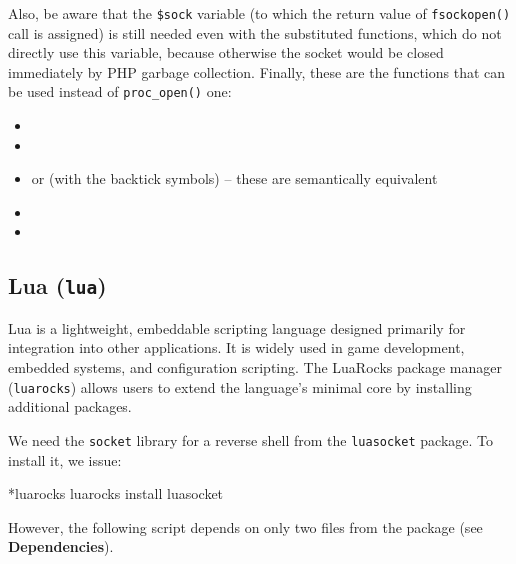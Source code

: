 Also, be aware that the \texttt{\$sock} variable (to which the return value of \texttt{fsockopen()} call is assigned) is still needed even with the substituted functions, which do not directly use this variable, because otherwise the socket would be closed immediately by PHP garbage collection. Finally, these are the functions that can be used instead of \texttt{proc\_open()} one:

\begin{itemize}

\item {}
\item {}
\item {} or  (with the backtick symbols) -- these are semantically equivalent
\item {}
\item {}

\end{itemize}


\subsection{Lua (\texttt{lua})}


Lua is a lightweight, embeddable scripting language designed primarily for integration into other applications. It is widely used in game development, embedded systems, and configuration scripting. The LuaRocks package manager (\texttt{luarocks}) allows users to extend the language's minimal core by installing additional packages.

We need the \texttt{socket} library for a reverse shell from the \texttt{luasocket} package. To install it, we issue:

\begin{cmdline}{*}{luarocks}{}
luarocks install luasocket
\end{cmdline}

However, the following script depends on only two files from the package (see \textbf{Dependencies}).


